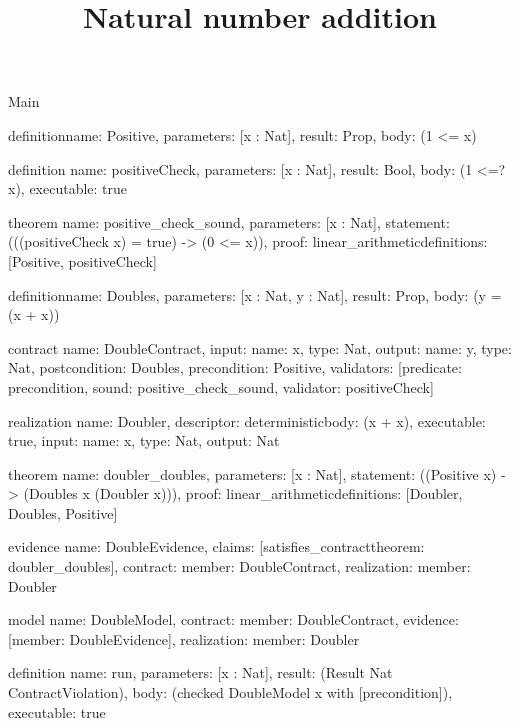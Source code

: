 \begin{lexlean}{Main}
\title{Natural number addition}
\begin{semanticmodule}
definition{name: Positive, parameters: [x : Nat], result: Prop, body: (1 <= x)}

definition{
  name: positiveCheck,
  parameters: [x : Nat],
  result: Bool,
  body: (1 <=? x),
  executable: true
}

theorem{
  name: positive_check_sound,
  parameters: [x : Nat],
  statement: (((positiveCheck x) = true) -> (0 <= x)),
  proof: linear_arithmetic{definitions: [Positive, positiveCheck]}
}

definition{name: Doubles, parameters: [x : Nat, y : Nat], result: Prop, body: (y = (x + x))}

contract{
  name: DoubleContract,
  input: {name: x, type: Nat},
  output: {name: y, type: Nat},
  postcondition: Doubles,
  precondition: Positive,
  validators: [{predicate: precondition, sound: positive_check_sound, validator: positiveCheck}]
}

realization{
  name: Doubler,
  descriptor: deterministic{body: (x + x)},
  executable: true,
  input: {name: x, type: Nat},
  output: Nat
}

theorem{
  name: doubler_doubles,
  parameters: [x : Nat],
  statement: ((Positive x) -> (Doubles x (Doubler x))),
  proof: linear_arithmetic{definitions: [Doubler, Doubles, Positive]}
}

evidence{
  name: DoubleEvidence,
  claims: [satisfies_contract{theorem: doubler_doubles}],
  contract: {member: DoubleContract},
  realization: {member: Doubler}
}

model{
  name: DoubleModel,
  contract: {member: DoubleContract},
  evidence: [{member: DoubleEvidence}],
  realization: {member: Doubler}
}

definition{
  name: run,
  parameters: [x : Nat],
  result: (Result Nat ContractViolation),
  body: (checked DoubleModel x with [precondition]),
  executable: true
}
\end{semanticmodule}
\end{lexlean}
